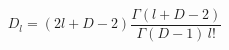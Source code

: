 \begin{equation}\label{Dlang}
  D_{l}=(2l+D-2)\frac{\Gamma (l+D-2)}{\Gamma (D-1)\,l!}
\end{equation}


